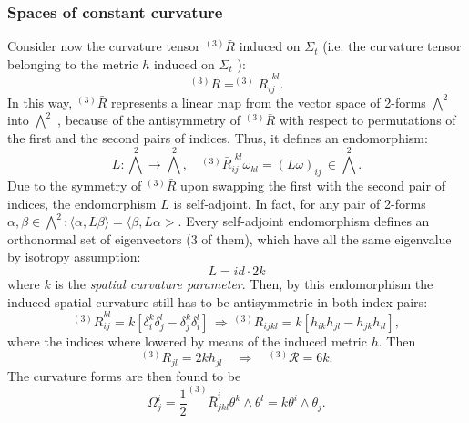 \subsubsection{Spaces of constant curvature}
Consider now the curvature tensor $^{(3)}\bar{R}$ induced on $\Sigma_t$  (i.e. the curvature
tensor belonging to the metric $h$ induced on $\Sigma_t$ ):
\begin{equation}
^{(3)} \bar{R} = ^{(3)}\bar{R}^{\;\, kl}_{ij}.
\end{equation}
In this way, $^{(3)} \bar{R}$ represents a linear map from the vector space of 2-forms $\bigwedge^2$into $\bigwedge^2$ , because of the antisymmetry of $^{(3)}\bar{R}$ with respect to
permutations of the first and the second pairs of indices. Thus, it defines
an endomorphism:
\begin{equation}
L:\bigwedge^{\,2} \rightarrow \bigwedge^{\,2}, \quad ^{(3)} \bar{R}^{\,\,kl}_{ij} \omega_{kl} = (L\omega)_{ij} \, \in \bigwedge^2.
\end{equation}
Due to the symmetry of $^{(3)}\bar{R}$ upon swapping the first with the
second pair of indices, the endomorphism $L$ is self-adjoint. In fact, for any pair of 2-forms $α, β \in \bigwedge^2: \langle \alpha, L \beta \rangle = \langle \beta, L \alpha>$. Every self-adjoint endomorphism defines an orthonormal set of eigenvectors (3 of them), which have all the same eigenvalue by isotropy assumption:
\begin{equation}
L = id \cdot 2 k
\end{equation}
where $k$ is the \emph{spatial curvature parameter}.
Then, by this endomorphism the induced spatial curvature still has to be antisymmetric in both index pairs:
\begin{equation}
^{(3)}\bar{R}_{ij}^{kl} = k \left[\delta^k_i \delta^l_j - \delta^k_j \delta^l_i \right]\, \Rightarrow \, ^{(3)}\bar{R}_{ijkl} = k \left[h_{ik} h_{jl} - h_{jk} h_{il}\right],
\end{equation}
where the indices where lowered by means of the induced metric $h$. Then
\begin{equation}
^{(3)}R_{jl} = 2 k h_{jl} \quad \Rightarrow \quad ^{(3)} \mathcal{R}= 6 k.
\end{equation}
The curvature forms are then found to be
\begin{equation}
\Omega^i_j = \frac{1}{2} ^{(3)} \bar{R}^i_{jkl} \theta^k \wedge \theta^l = k \theta^i \wedge \theta_j.
\end{equation}

